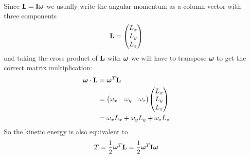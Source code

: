 \documentclass[../hw.tex]{subfiles}
\begin{document}
Since $\vb L = \vb I \vb*\omega$ we usually write the angular momentum as a column vector with three
components
\begin{align*}
    \vb L = \mqty(L_x \\ L_y \\ L_z)
\end{align*}
and taking the cross product of $\vb L$ with $\vb*\omega$ we will have to transpose $\vb*\omega$ to
get the correct matrix multiplication:
\begin{align*}
    \vb*\omega \cdot \vb L &= \vb*\omega^T \vb L \\
    &= \mqty(\omega_x & \omega_y & \omega_z) \mqty(L_x \\ L_y \\ L_z) \\
    &= \omega_x L_x + \omega_y L_y + \omega_z L_z
\end{align*}
So the kinetic energy is also equivalent to 
\begin{align*}
    T = \frac{1}{2} \vb*\omega^T \vb L = \frac{1}{2} \vb*\omega^T \vb I \vb*\omega
\end{align*}

\newpage
\end{document}
